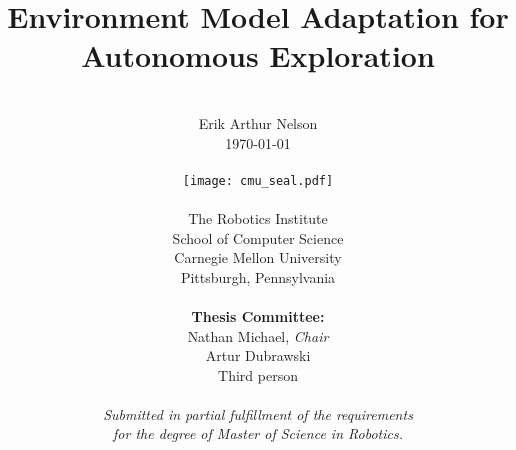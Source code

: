 \author{
  \\
        Erik Arthur Nelson \\
        \today \\
  \\
        \texttt{[image: cmu\_seal.pdf]}
  \\
  \\
        The Robotics Institute \\
        School of Computer Science \\
        Carnegie Mellon University \\
        Pittsburgh, Pennsylvania \\
  \\
        {\bf Thesis Committee:} \\
        Nathan Michael, {\it Chair} \\
        Artur Dubrawski \\
        Third person \\
  \\
        \textit{Submitted in partial fulfillment of the requirements} \\
        \textit{for the degree of Master of Science in Robotics.}
}

\title{\bf{
  Environment Model Adaptation for Autonomous Exploration
}}

\date{}
